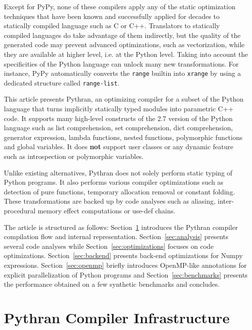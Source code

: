 \documentclass[10pt, onecolumn, preprint]{sigplanconf}
\begin{document}
Except for PyPy, none of these compilers apply any of the
static optimization techniques that have been known and successfully applied 
for decades to statically compiled language such as C or C++.
Translators to statically compiled languages do take advantage of them
indirectly, but the quality of the generated code may prevent advanced
optimizations, such as vectorization, %
while they are available at higher level,
i.e. at the Python level. Taking into account the specificities of the Python
language can unlock many new transformations. %
For instance, PyPy automatically
converts the \texttt{range} builtin into \texttt{xrange} by using a dedicated
structure called \texttt{range-list}.

This article presents Pythran, an optimizing compiler for a subset of the
Python language that turns implicitly statically typed modules into parametric
C++ code. It supports many high-level constructs of the 2.7 version of the
Python language such as list comprehension, set comprehension, dict
comprehension, generator expression, lambda functions, nested functions,
polymorphic functions and global variables. It does \textbf{not} support user
classes or any dynamic feature such as introspection or polymorphic variables.

Unlike existing alternatives, Pythran does not solely perform static typing of
Python programs. It also performs various compiler optimizations such as
detection of pure functions, temporary allocation removal or constant folding.
These transformations are backed up by code analyses such as aliasing,
inter-procedural memory effect computations or use-def chains.

The article is structured as follows: Section~\ref{sec:infrastructure}
introduces the Pythran compiler compilation flow and internal representation.
Section~\ref{sec:analysis} presents several code analyses while
Section~\ref{sec:optimizations} focuses on code optimizations.
Section~\ref{sec:backend} presents back-end optimizations for Numpy
expressions. Section~\ref{sec:openmp}  briefly introduces OpenMP-like
annotations for explicit parallelization of Python programs and
Section~\ref{sec:benchmarks} presents the performance obtained on a few
synthetic benchmarks and concludes.


\section{Pythran Compiler Infrastructure}
\label{sec:infrastructure}
\end{document}
